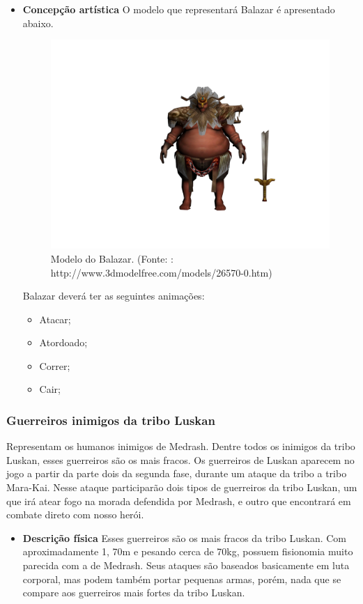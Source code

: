 \begin{itemize}
\item{\bf Concepção artística} O modelo que representará Balazar é apresentado abaixo.
 \begin{figure}[H]
 \centering
 \includegraphics[scale=0.33]{Imagens/inimigo01.png}
 \caption{Modelo do Balazar. (Fonte: : http://www.3dmodelfree.com/models/26570-0.htm)}
\label{img:balazar}
\end{figure}

Balazar deverá ter as seguintes animações: 
\begin{itemize}
\item {Atacar;}
\item {Atordoado;}
\item {Correr;}
\item {Cair;}
\end{itemize}
\end{itemize}
\subsubsection{Guerreiros inimigos da tribo Luskan}
Representam os humanos inimigos de Medrash. Dentre todos os inimigos da tribo Luskan, esses guerreiros são os mais fracos. Os guerreiros de Luskan aparecem no jogo a partir da parte dois da segunda fase, durante um ataque da tribo a tribo Mara-Kai. Nesse ataque participarão dois tipos de guerreiros da tribo Luskan, um que irá atear fogo na morada defendida por Medrash, e outro que encontrará em combate direto com nosso herói.

\begin{itemize}
\item{\bf Descrição física}
Esses guerreiros são os mais fracos da tribo Luskan. Com aproximadamente 1, 70m e pesando cerca de 70kg, possuem fisionomia muito parecida com a de Medrash. Seus ataques são baseados basicamente em luta corporal, mas podem também portar pequenas armas, porém, nada que se compare aos guerreiros mais fortes da tribo Luskan.
\end{itemize}

